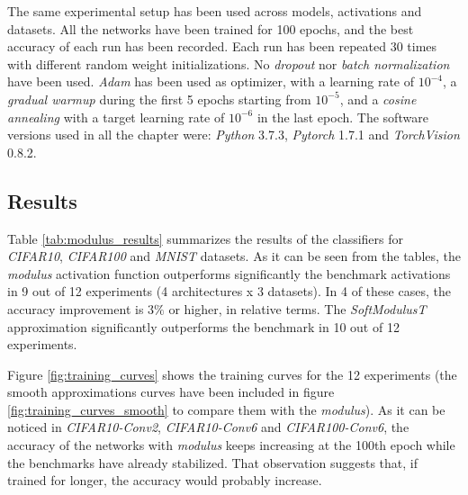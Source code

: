 The same experimental setup has been used across models, activations and datasets. All the networks have been trained for 100 epochs, and the best accuracy of each run has been recorded. Each run has been repeated 30 times with different random weight initializations. No \textit{dropout} \autocite{srivastava2014} nor \textit{batch normalization} \autocite{ioffe2015} have been used. \textit{Adam} \autocite{kingma14} has been used as optimizer, with a learning rate of $10^{-4}$, a \textit{gradual warmup} \autocite{gotmare2018} during the first 5 epochs starting from $10^{-5}$, and a \textit{cosine annealing} \autocite{loshchilov2017} with a target learning rate of $10^{-6}$ in the last epoch. The software versions used in all the chapter were: \textit{Python} 3.7.3, \textit{Pytorch} 1.7.1 and  \textit{TorchVision} 0.8.2. 


\subsection{Results}
Table \ref{tab:modulus_results} summarizes the results of the classifiers for \textit{CIFAR10}, \textit{CIFAR100} and \textit{MNIST} datasets. As it can be seen from the tables, the \textit{modulus} activation function outperforms significantly the benchmark activations in 9 out of 12 experiments (4 architectures x 3 datasets). In 4 of these cases, the accuracy improvement is $3\%$ or higher, in relative terms. The \textit{SoftModulusT} approximation significantly outperforms the benchmark in 10 out of 12 experiments.


Figure \ref{fig:training_curves} shows the training curves for the 12 experiments (the smooth approximations curves have been included in figure \ref{fig:training_curves_smooth} to compare them with the \textit{modulus}). As it can be noticed in \textit{CIFAR10-Conv2}, \textit{CIFAR10-Conv6} and \textit{CIFAR100-Conv6}, the accuracy of the networks with \textit{modulus} keeps increasing at the 100th epoch while the benchmarks have already stabilized. That observation suggests that, if trained for longer, the accuracy would probably increase.


